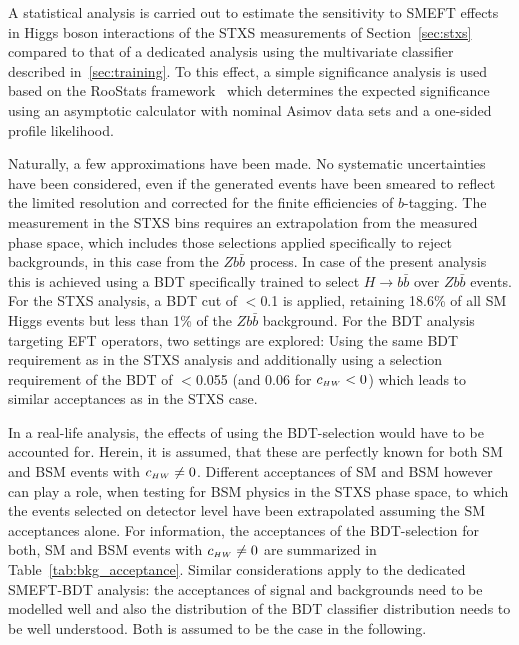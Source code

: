 A statistical analysis is carried out to estimate the sensitivity to SMEFT effects in Higgs boson interactions of the STXS measurements of Section~\ref{sec:stxs} compared to that of a dedicated analysis using the multivariate classifier described in~\ref{sec:training}. To this effect, a simple significance analysis is used based on the {\sc RooStats} framework~\cite{Moneta:2010pm} which determines the expected significance using an asymptotic calculator with nominal Asimov data sets and a one-sided profile likelihood. 

Naturally, a few approximations have been made. No systematic uncertainties have been considered, even if the generated events have been smeared to reflect the limited resolution and corrected for the finite efficiencies of $b$-tagging. The measurement in the STXS bins requires an extrapolation from the measured phase space, which includes those selections applied specifically to reject backgrounds, in this case from the $Z b\bar{b}$ process. In case of the present analysis this is achieved using a BDT specifically trained to select $H\to b\bar{b}$ over $Z b\bar{b}$ events. For the STXS analysis, a BDT cut of $<$0.1 is applied, retaining 18.6\% of all SM Higgs events but less than 1\% of the $Z b\bar{b}$ background. For the BDT analysis targeting EFT operators, two settings are explored: Using the same BDT requirement as in the STXS analysis and additionally using a selection requirement of the BDT of $<$0.055 (and 0.06 for $c_{\scriptscriptstyle HW} <0$) which leads to similar acceptances as in the STXS case. 

In a real-life analysis, the effects of using the BDT-selection would have to be accounted for. Herein, it is assumed, that these are perfectly known for both SM and BSM events with $c_{\scriptscriptstyle HW} \neq 0$. Different acceptances of SM and BSM however can play a role, when testing for BSM physics in the STXS phase space, to which the events selected on detector level have been extrapolated assuming the SM acceptances alone. For information, the acceptances of the BDT-selection for both, SM and BSM events with $c_{\scriptscriptstyle HW} \neq 0$ are summarized in Table~\ref{tab:bkg_acceptance}. Similar considerations apply to the dedicated SMEFT-BDT analysis: the acceptances of signal and backgrounds need to be modelled well and also the distribution of the BDT classifier distribution needs to be well understood. Both is assumed to be the case in the following.

